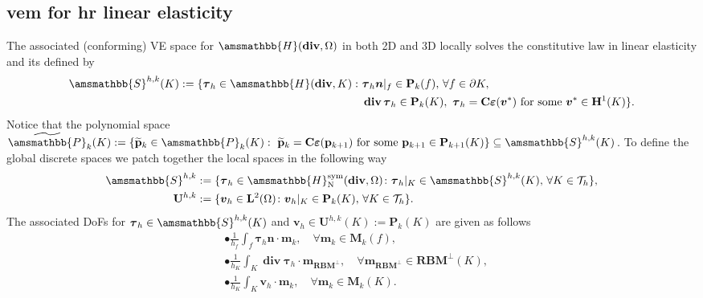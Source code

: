 \documentclass[fleqn,a4paper]{cas-sc}
\newcommand\bdiv{\mathop{\mathbf{div}}\nolimits}
\newcommand{\beps}{\boldsymbol{\varepsilon}}
\newcommand{\bC}{\mathbf{C}}
\newcommand{\bbS}{\amsmathbb{S}}
\newcommand{\bn}{\boldsymbol{n}}
\newcommand{\bv}{\boldsymbol{v}}
\newcommand{\bp}{\mathbf{p}}
\newcommand{\bm}{\mathbf{m}}
\newcommand{\0}{\boldsymbol{0}}
\newcommand\cT{\mathcal{T}}
\newcommand\bP{\mathbf{P}}
\newcommand\bM{\mathbf{M}}
\newcommand\bU{\mathbf{U}}
\newcommand\bbH{\amsmathbb{H}}
\newcommand\bbP{\amsmathbb{P}}
\newcommand\bH{\mathbf{H}}
\newcommand\bL{\mathbf{L}}
\newcommand\btau{\boldsymbol{\tau}}
\numberwithin{equation}{section}
\numberwithin{figure}{section}
\begin{document}
\subsection{\gls{vem} for \gls{hr} linear elasticity}\label{sec:HRVEM} The associated (conforming) VE space for $\bbH({\mathbf{div}},\Omega)$ in both 2D and 3D locally solves the constitutive law in linear elasticity \cite{artioli18,visinoni24} and its defined by 
\begin{align*} 
    \bbS^{h,k}(K):= \{\btau_h\in \bbH({\mathbf{div}},K) :\ &\btau_h\bn|_{{f}} \in \bP_k(f) ,\, \forall f\in \partial K, \\
    & \bdiv\btau_h \in \bP_k(K),\ \btau_h=\bC\beps(\bv^*) \ \text{for some}\ \bv^*\in \bH^1(K) \}.
\end{align*}
Notice that the polynomial space $\widetilde{\bbP}_k(K):=\{\widetilde{\bp}_k \in \bbP_k(K):\ \widetilde{\bp}_k=\bC\beps(\bp_{k+1})\ \text{for some}\ \bp_{k+1}\in \bP_{k+1}(K)\}\subseteq \bbS^{h,k}(K)$. To define the global discrete spaces we patch together the local spaces in the following way
\begin{align*}
    \bbS^{h,k} &:= \{ \btau_h \in \bbH^{\mathrm{sym}}_{\mathrm{N}}(\bdiv,\Omega) \colon \btau_h|_K \in \bbS^{h,k}(K) ,\, \forall K\in {\cT_h} \}, \\
    \bU^{h,k} &:= \{ \bv_h\in \bL^2(\Omega) \colon \bv_h|_K\in \bP_{k}(K) ,\, \forall K\in \cT_h \}.
\end{align*}
The associated DoFs for $\btau_h \in \bbS^{h,k}(K)$ and $\bv_h \in \bU^{h,k}(K):=\bP_{k}(K)$ are given as follows
\begin{align*}
    &\bullet \frac{1}{h_f}\int_f \btau_h\bn \cdot \bm_k ,\quad \forall \bm_k \in \bM_k(f), \\
    &\bullet \frac{1}{h_K}\int_K \bdiv\btau_h\cdot\bm_{{\textbf{RBM}}^\perp} ,\quad  \forall \bm_{{\textbf{RBM}}^\perp}\in \textbf{RBM}^\perp(K), \\
    &\bullet \frac{1}{h_K}\int_K \bv_h \cdot \bm_k ,\quad \forall \bm_k \in \bM_k(K).
\end{align*}
\end{document}
